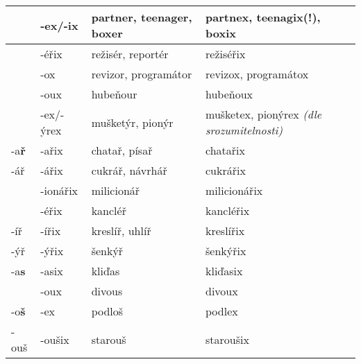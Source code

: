 \begin{table}
{\begin{longtabu}{|X[1,R]|X[1,R]|X[3,L]|X[3,L]|}
&-ex/-ix&partner, teenager, boxer&partnex, teenagix(!), boxix\\\hline%
&-éřix  &režisér, reportér  &režiséřix\\\hline%
&-ox    &revizor, programátor     &revizox, programátox\\\hline%
&-oux   &hubeňour           &hubeňoux\\\hline%
&-ex/-ýrex&mušketýr, pionýr &mušketex, pionýrex {\footnotesize\emph{(dle srozumitelnosti)}}\\\hline%

-a\textbf{ř}    &-ařix  &chatař, písař      &chatařix\\\hline%
-ář             &-ářix  &cukrář, návrhář    &cukrářix\\\hline%
&-ionářix&milicionář         &milicionářix\\\hline%
&-éřix  &kancléř            &kancléřix\\\hline%
-íř             &-ířix  &kreslíř, uhlíř     &kreslířix\\\hline%
-ýř             &-ýřix  &šenkýř&šenkýřix\\\hline%

-a\textbf{s}    &-asix  &kliďas             &kliďasix\\\hline%
&-oux   &divous             &divoux\\\hline%


-o\textbf{š}    &-ex    &podloš             &podlex\\\hline%
-ouš            &-oušix &starouš            &staroušix\\\hline%


\end{longtabu}}
\end{table}
